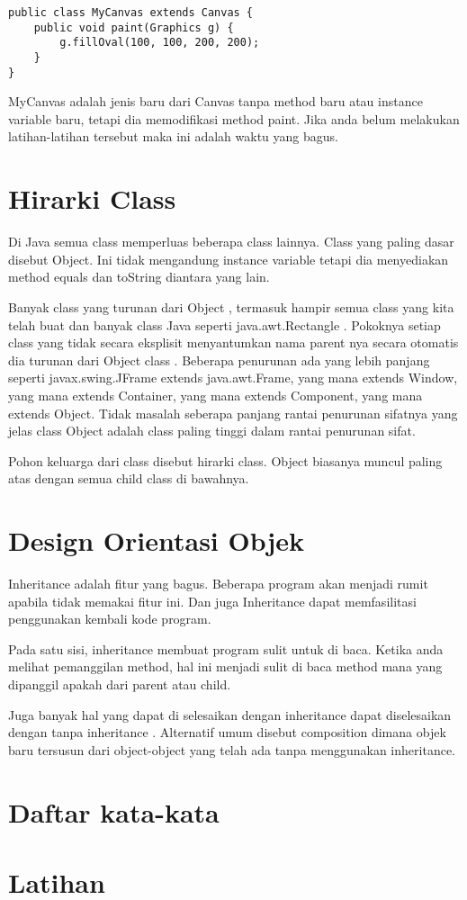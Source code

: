 \begin{lstlisting}
public class MyCanvas extends Canvas {
	public void paint(Graphics g) {
		g.fillOval(100, 100, 200, 200);
	}
}
\end{lstlisting}

MyCanvas adalah jenis baru dari Canvas tanpa method baru atau instance variable baru, tetapi dia memodifikasi method paint. Jika anda belum melakukan latihan-latihan tersebut maka ini adalah waktu yang bagus.

\section{Hirarki Class} %

Di Java semua class memperluas beberapa class lainnya. Class yang paling dasar disebut Object. Ini tidak mengandung instance variable tetapi dia menyediakan method equals dan toString diantara yang lain.

Banyak class yang turunan dari Object , termasuk hampir semua class yang kita telah buat dan banyak class Java seperti java.awt.Rectangle . Pokoknya setiap class yang tidak secara eksplisit menyantumkan nama parent nya secara otomatis dia turunan dari Object class . Beberapa penurunan ada yang lebih panjang seperti javax.swing.JFrame extends java.awt.Frame, yang mana  extends Window, yang mana extends Container, yang mana extends Component, yang mana extends Object. Tidak masalah seberapa panjang rantai penurunan sifatnya yang jelas class Object adalah class paling tinggi dalam rantai penurunan sifat.

Pohon keluarga dari class disebut hirarki class.  Object biasanya muncul paling atas dengan semua child class di bawahnya.

\section{Design Orientasi Objek} %

Inheritance adalah fitur yang bagus. Beberapa program akan menjadi rumit apabila tidak memakai fitur ini. Dan juga Inheritance dapat memfasilitasi penggunakan kembali kode program.

Pada satu sisi, inheritance membuat program sulit untuk di baca. Ketika anda melihat pemanggilan method, hal ini menjadi sulit di baca method mana yang dipanggil apakah dari parent atau child.

Juga banyak hal yang dapat di selesaikan dengan inheritance dapat diselesaikan dengan tanpa inheritance . Alternatif umum disebut composition dimana objek baru tersusun dari object-object yang telah ada tanpa menggunakan inheritance. 

\section{Daftar kata-kata}%
\section{Latihan}%
